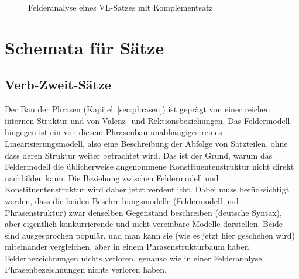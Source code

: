 \begin{figure}
  \centering
  \caption{Felderanalyse eines VL-Satzes mit Komplementsatz}
  \label{fig:syn3334wb2}
\end{figure}

\section{Schemata für Sätze}

\label{sec:satzschemata}
\label{sec:verbzweitsatz}

\subsection{Verb-Zweit-Sätze}

\label{sec:konstituentenstrukturinv2}

Der Bau der Phrasen (Kapitel~\ref{sec:phrasen}) ist geprägt von einer reichen internen Struktur und von Valenz- und Rektionsbeziehungen.
Das Feldermodell hingegen ist ein von diesem Phrasenbau unabhängiges reines Linearisierungsmodell, also eine Beschreibung der Abfolge von Satzteilen, ohne dass deren Struktur weiter betrachtet wird.
Das ist der Grund, warum das Feldermodell die üblicherweise angenommene Konstituentenstruktur nicht direkt nachbilden kann.
Die Beziehung zwischen Feldermodell und Konstituentenstruktur wird daher jetzt verdeutlicht.
Dabei muss berücksichtigt werden, dass die beiden Beschreibungsmodelle (Feldermodell und Phrasenstruktur) zwar denselben Gegenstand beschreiben (deutsche Syntax), aber eigentlich konkurrierende und nicht vereinbare Modelle darstellen.
Beide sind ausgesprochen populär, und man kann sie (wie es jetzt hier geschehen wird) miteinander vergleichen, aber in einem Phrasenstrukturbaum haben Felderbezeichnungen nichts verloren, genauso wie in einer Felderanalyse Phrasenbezeichnungen nichts verloren haben.

